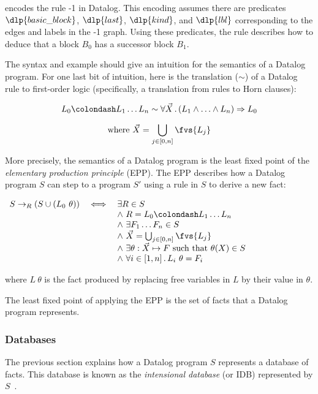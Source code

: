 \documentclass{article}
\begin{document}
 encodes the rule {\bb}-1 in Datalog.
This encoding assumes there are predicates $\dlp{basic\_block}$, $\dlp{last}$, $\dlp{kind}$, and $\dlp{lbl}$ corresponding to the edges and labels in the {\bb}-1 graph.
Using these predicates, the rule describes how to deduce that a block $B_0$ has a successor block $B_1$.

The syntax and example should give an intuition for the semantics of a Datalog program.
For one last bit of intuition, here is the translation ($\sim$) of a Datalog rule to first-order logic (specifically, a translation from rules to Horn clauses):


\[
  L_0 \colondash L_1 \ldots L_n
  \sim
  \forall \vec{X}\,.\,(L_1 \wedge \ldots \wedge L_n) \Rightarrow L_0
\]

\[
  \mbox{where } \vec{X} = \bigcup_{j \in [0,n]} \fvs{L_j}
\]

More precisely, the semantics of a Datalog program is the least fixed point of the \emph{elementary production principle} (EPP).
The EPP describes how a Datalog program $S$ can step to a program $S'$ using a rule in $S$ to derive a new fact:

\begin{center}$\begin{array}{l l l}
  S \rightarrow_R (S \cup (L_0~\theta))
  & \iff & \exists R \in S
  \\ & & \wedge~R = L_0 \colondash L_1 \ldots L_n
  \\ & & \wedge~\exists F_1 \ldots F_n \in S
  \\ & & \wedge~\vec{X} = \bigcup_{j\in [0,n]} \fvs{L_j}
  \\ & & \wedge~\exists \theta : \vec{X} \mapsto F \mbox{ such that } \theta(X) \in S
  \\ & & \wedge~\forall i \in [1,n]\,.\, L_i~\theta = F_i
\end{array}$\end{center}
\noindent where $L~\theta$ is the fact produced by replacing free variables in $L$ by their value in $\theta$.

The least fixed point of applying the EPP is the set of facts that a Datalog program represents.


\subsubsection*{Databases}

The previous section explains how a Datalog program $S$ represents a database of facts.
This database is known as the \emph{intensional database} (or IDB) represented by $S$~\cite{cgt-ieee-1989}.
\end{document}
